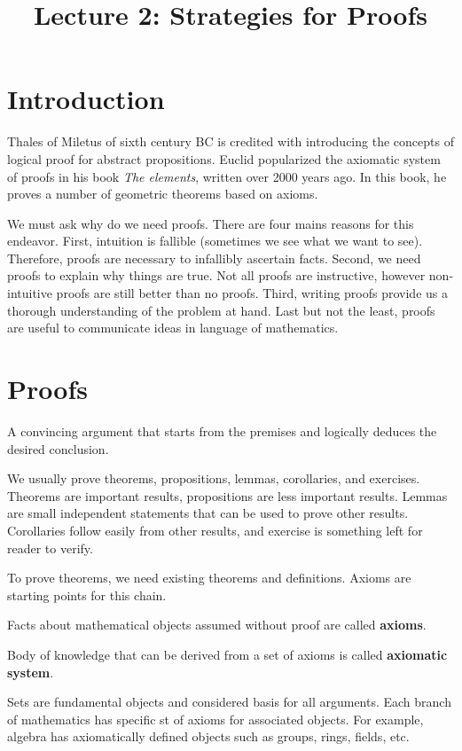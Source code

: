 \documentclass[a4paper,english,12pt]{article}
\begin{document}
\title{Lecture 2: Strategies for Proofs}
\maketitle

\section{Introduction}
Thales of Miletus of sixth century BC is credited with introducing the concepts of logical proof for abstract propositions. Euclid popularized the axiomatic system of proofs in his book \emph{The elements}, written over 2000 years ago. In this book, he proves a number of geometric theorems based on axioms.

We must ask why do we need proofs. There are four mains reasons for this endeavor. First, intuition is fallible (sometimes we see what we want to see). Therefore, proofs are necessary to infallibly ascertain facts. Second, we need proofs to explain why things are true. Not all proofs are instructive, however non-intuitive proofs are still better than no proofs. Third, writing proofs provide us a thorough understanding of the problem at hand. Last but not the least, proofs are useful to communicate ideas in language of mathematics. 

\section{Proofs}
\begin{defn} A convincing argument that starts from the premises and logically deduces the desired conclusion.
\end{defn}
We usually prove theorems, propositions, lemmas, corollaries, and exercises. Theorems are important results, propositions are less important results. Lemmas are small independent statements that can be used to prove other results. Corollaries follow easily from other results, and exercise is something left for reader to verify. 

To prove theorems, we need existing theorems and definitions. Axioms are starting points for this chain.
\begin{defn}[Axioms] Facts about mathematical objects assumed without proof are called \textbf{axioms}.
\end{defn}
\begin{defn} Body of knowledge that can be derived from a set of axioms is called \textbf{axiomatic system}.
\end{defn}
Sets are fundamental objects and considered basis for all arguments. Each branch of mathematics has specific st of axioms for associated objects. For example, algebra has axiomatically defined objects such as groups, rings, fields, etc.
\end{document}
